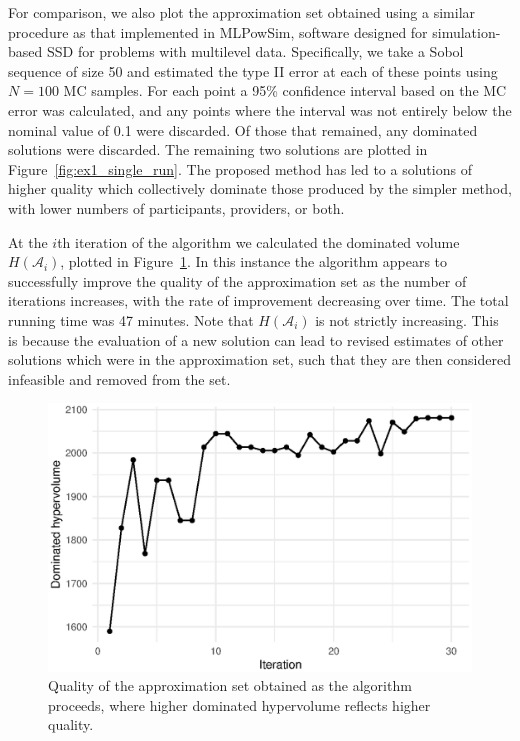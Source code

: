 \documentclass[sagev]{sagej}
\begin{document}
For comparison, we also plot the approximation set obtained using a similar procedure as that implemented in MLPowSim, software designed for simulation-based SSD for problems with multilevel data. Specifically, we take a Sobol sequence of size 50 and estimated the type II error at each of these points using $N = 100$ MC samples. For each point a 95\% confidence interval based on the MC error was calculated, and any points where the interval was not entirely below the nominal value of 0.1 were discarded. Of those that remained, any dominated solutions were discarded. The remaining two solutions are plotted in Figure~\ref{fig:ex1_single_run}. The proposed method has led to a solutions of higher quality which collectively dominate those produced by the simpler method, with lower numbers of participants, providers, or both.

At the $i$th iteration of the algorithm we calculated the dominated volume $H(\mathcal{A}_{i})$, plotted in Figure~\ref{fig:ex1_traj}. In this instance the algorithm appears to successfully improve the quality of the approximation set as the number of iterations increases, with the rate of improvement decreasing over time. The total running time was 47 minutes. Note that $H(\mathcal{A}_{i})$ is not strictly increasing. This is because the evaluation of a new solution can lead to revised estimates of other solutions which were in the approximation set, such that they are then considered infeasible and removed from the set. 

\begin{figure}
\centering
\includegraphics[scale=0.8]{./figures/ex1_traj.eps}
\caption{Quality of the approximation set obtained as the algorithm proceeds, where higher dominated hypervolume reflects higher quality.}
\label{fig:ex1_traj}
\end{figure}
\end{document}
